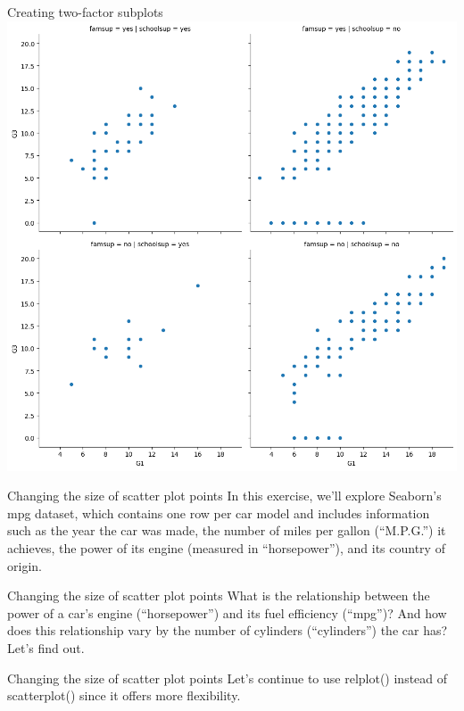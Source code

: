 \documentclass[
  ignorenonframetext,
]{beamer}
\begin{document}
\begin{frame}{Creating two-factor subplots}
\label{creating-two-factor-subplots-8}
\includegraphics{../images/im267.png}
\end{frame}

\begin{frame}{Changing the size of scatter plot points}
\label{changing-the-size-of-scatter-plot-points}
In this exercise, we'll explore Seaborn's mpg dataset, which contains
one row per car model and includes information such as the year the car
was made, the number of miles per gallon (``M.P.G.'') it achieves, the
power of its engine (measured in ``horsepower''), and its country of
origin.
\end{frame}

\begin{frame}{Changing the size of scatter plot points}
\label{changing-the-size-of-scatter-plot-points-1}
What is the relationship between the power of a car's engine
(``horsepower'') and its fuel efficiency (``mpg'')? And how does this
relationship vary by the number of cylinders (``cylinders'') the car
has? Let's find out.
\end{frame}

\begin{frame}{Changing the size of scatter plot points}
\label{changing-the-size-of-scatter-plot-points-2}
Let's continue to use relplot() instead of scatterplot() since it offers
more flexibility.
\end{frame}
\end{document}
